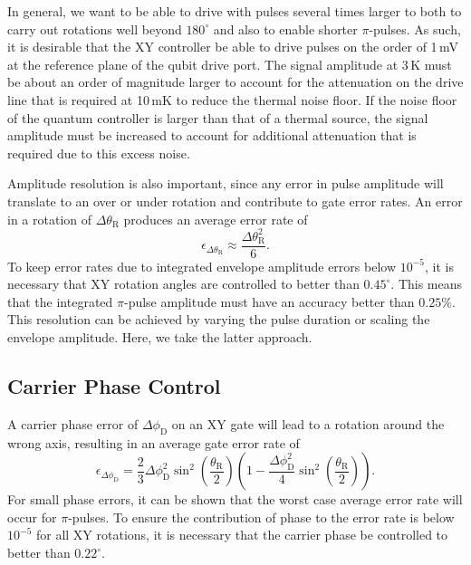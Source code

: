 \documentclass[journal]{IEEEtran}
\newcommand{\CR}[1]{{\color{black}#1}}
\begin{document}
\CR{In general, we want to be able to drive with pulses several times larger to both to carry out rotations well beyond $180^\circ$ and also to enable shorter $\pi$-pulses}. As such, it is desirable that the XY controller be able to drive pulses on the order of 1\,mV at the reference plane of the qubit drive port. The signal \CR{amplitude} at \CR{3\,K} must be about an order of magnitude larger to account for the attenuation on the drive line that is required at 10\,mK to reduce the thermal noise floor. \CR{If the noise floor of the quantum controller is larger than that of a thermal source, the signal amplitude must be increased to account for additional attenuation that is required due to this excess noise.}

Amplitude resolution is also important, since any error in pulse amplitude will translate to an over or under rotation and contribute to gate error rates. An error in a rotation of $\Delta{\theta_\text{R}}$ produces an average error rate of
\begin{equation}
\epsilon_{\Delta{\theta_\text{R}}}\approx{}\frac{\Delta{}\theta_\text{R}^2}{6}.
\end{equation}
To keep error rates due to integrated envelope amplitude errors below $10^{-5}$, it is necessary that XY rotation angles are controlled to better than \CR{$0.45^\circ$}. This means that the integrated $\pi$-pulse amplitude must have an accuracy better than $0.25\%$. \CR{This resolution can be achieved by varying the pulse duration or scaling the envelope amplitude. Here, we take the latter approach.}%
\subsection{Carrier Phase Control}
A carrier phase error of $\Delta\phi_\text{D}$ on an XY gate will lead to a rotation around the wrong axis, resulting in an average gate error rate of 
\begin{equation}
\epsilon_{\Delta\phi_\text{D}}=\frac{2}{3}\Delta\phi_\text{D}^2\sin^2\left(\frac{\theta_\text{R}}{2}\right)\left(1-\frac{\Delta\phi_\text{D}^2}{4}\sin^2\left(\frac{\theta_\text{R}}{2}\right)\right).
\end{equation} 
For small phase errors, it can be shown that the worst case average error rate will occur for $\pi$-pulses. To ensure the contribution of phase to the error rate is below \CR{$10^{-5}$} for all XY rotations, it is necessary that the carrier phase be controlled to better than \CR{$0.22^\circ$}. 
\end{document}
